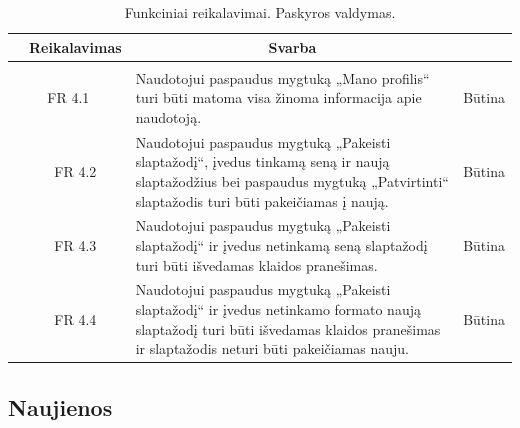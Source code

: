 \documentclass{VUMIFPSkursinis}
\begin{document}
	\begin{table}[H]
	\caption{Funkciniai reikalavimai. Paskyros valdymas.}
	\begin{tabular}{|p{1cm}|p{1cm}|p{}|p{}|}
		\hline 
		\rowcolor{gray!50}
		\multicolumn{2}{|c|}{{\bfseries Kodas}}&
		\multicolumn{1}{c|}{{\bfseries Reikalavimas}}&
		\multicolumn{1}{c|}{{\bfseries Svarba}}\\
		\hline
		\rowcolor{lightgray}
		\multicolumn{4}{|c|}{Paskyros valdymas}\\				
		\hline
		\multicolumn{2}{|c|}{FR 4.1}&
		{Naudotojui paspaudus mygtuką „Mano profilis“ turi būti matoma visa žinoma informacija apie naudotoją.
		}&		
		\multicolumn{1}{c|}{Būtina}\\
		\hline
		\multicolumn{1}{|c}{}&
		\multicolumn{1}{c|}{FR 4.2}&
		{Naudotojui paspaudus mygtuką „Pakeisti slaptažodį“, įvedus tinkamą seną ir naują slaptažodžius bei paspaudus mygtuką „Patvirtinti“ slaptažodis turi būti pakeičiamas į naują.
		}&		
		\multicolumn{1}{c|}{Būtina}\\
		\hline
		\multicolumn{1}{|c}{}&
		\multicolumn{1}{c|}{FR 4.3}&
		{Naudotojui paspaudus mygtuką „Pakeisti slaptažodį“ ir įvedus netinkamą seną slaptažodį turi būti išvedamas klaidos pranešimas.
		}&
		\multicolumn{1}{c|}{Būtina}\\	
		\hline		
		\multicolumn{1}{|c}{}&
		\multicolumn{1}{c|}{FR 4.4}&
		{Naudotojui paspaudus mygtuką „Pakeisti slaptažodį“ ir įvedus netinkamo formato naują slaptažodį turi būti išvedamas klaidos pranešimas ir slaptažodis neturi būti pakeičiamas nauju.
		}&
		\multicolumn{1}{c|}{Būtina}\\									
		\hline
	\end{tabular}		
\end{table}

\subsection{Naujienos}
\end{document}
